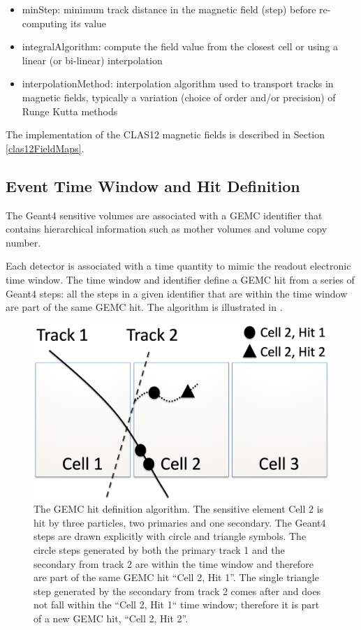 \begin{itemize}
	\item minStep: minimum track distance in the magnetic field (step) before re-computing its value
	\item integralAlgorithm: compute the field value from the closest cell or using a linear (or bi-linear) interpolation
	\item interpolationMethod: interpolation algorithm used to transport tracks in magnetic fields, typically
		  a variation (choice of order and/or precision) of Runge Kutta \cite{rungeKutta} methods
\end{itemize}

The implementation of the CLAS12 magnetic fields is described in Section \ref{clas12FieldMaps}.

\subsection{Event Time Window and Hit Definition}

The Geant4 sensitive volumes are associated with a GEMC identifier that contains hierarchical information such as mother volumes
and volume copy number.

Each detector is associated with a time quantity to mimic the readout electronic time window. The time window and identifier
define a GEMC hit from a series of Geant4 steps: all the steps in a given identifier that are within the time window
are part of the same GEMC hit. The algorithm is illustrated in .

\begin{figure}
	\centering
	\includegraphics[width=0.99\columnwidth,keepaspectratio]{img/hitDefinition.png}
	\caption{The GEMC hit definition algorithm. The sensitive element Cell 2 is hit by three particles, two primaries and one secondary.
             The Geant4 steps are drawn explicitly with circle and triangle symbols. The circle steps generated by both the primary track 1 and the secondary
             from track 2 are within the time window and therefore are part of the same GEMC hit ``Cell 2, Hit 1''.
             The single triangle step generated by the secondary from track 2 comes after and does not fall within the ``Cell 2, Hit 1``
             time window; therefore it is part of a new GEMC hit, ``Cell 2, Hit 2''.}
	\label{fig:hitDefinition}
\end{figure}

